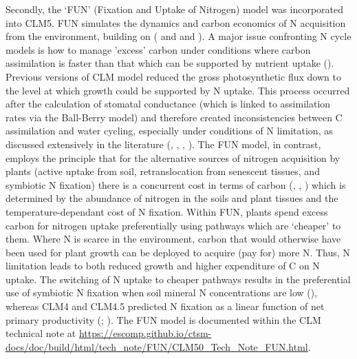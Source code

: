 \usepackage{}\documentclass[draft,linenumbers]{agujournal}
\begin{document}
Secondly, the `FUN' (Fixation and Uptake of Nitrogen) model was incorporated into CLM5. FUN simulates the dynamics and carbon economics of N acquisition from the environment, building on (\cite{fisher2010fun} and \cite{brzostek2014} and \cite{shi2016}). A major issue confronting N cycle models is how to manage 'excess' carbon under conditions where carbon assimilation is faster than that which can be supported by nutrient uptake (\cite{dekauwe2014}). Previous versions of CLM model reduced the gross photosynthetic flux down to the level at which growth could be supported by N uptake. This process occurred after the calculation of stomatal conductance (which is linked to assimilation rates via the Ball-Berry model) and therefore created inconsistencies between C assimilation and water cycling, especially under conditions of N limitation, as discussed extensively in the literature (\cite{medlyn2011}, \cite{bonan2012}, \cite{dekauwe2014}, \cite{walker2014}). The FUN model, in contrast, employs the principle that for the alternative sources of nitrogen acquisition by plants (active uptake from soil, retranslocation from senescent tissues, and symbiotic N fixation) there is a concurrent cost in terms of carbon (\cite{bloom1985}, \cite{jiang2017}, \cite{terrer2018}) which is determined by the abundance of nitrogen in the soils and plant tissues and the temperature-dependant cost of N fixation. Within FUN, plants spend excess carbon for nitrogen uptake preferentially using pathways which are `cheaper' to them. Where N is scarce in the environment, carbon that would otherwise have been used for plant growth can be deployed to acquire (pay for) more N. Thus, N limitation leads to both reduced growth and higher expenditure of C on N uptake.   The switching of N uptake to cheaper pathways results in the preferential use of symbiotic N fixation when soil mineral N concentrations are low (\cite{vitousek2002}), whereas CLM4 and CLM4.5 predicted N fixation as a linear function of net primary productivity (\cite{cleveland1999}; \cite{wieder2015}).   The FUN model is documented within the CLM technical note at \url{https://escomp.github.io/ctsm-docs/doc/build/html/tech_note/FUN/CLM50_Tech_Note_FUN.html}. 
 
\end{document}
